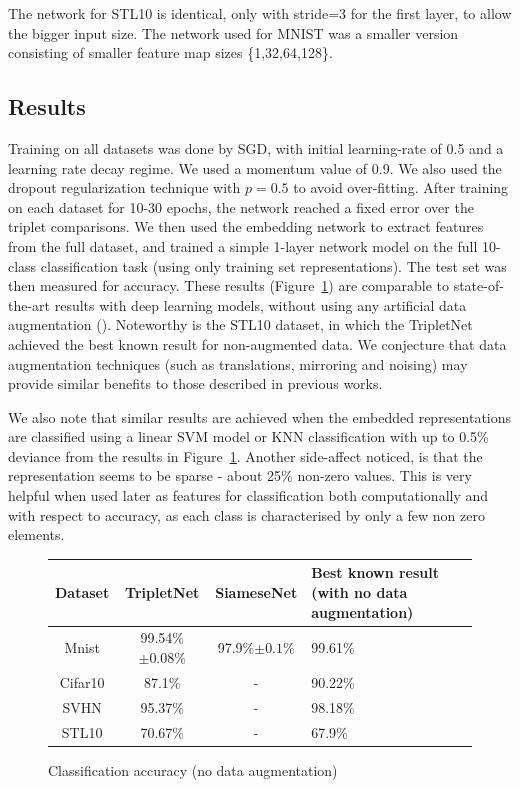 \documentclass{article} %
\begin{document}
 The network for STL10 is identical, only with stride=3 for the first layer, to allow the bigger input size. The network used for MNIST was a smaller version consisting of smaller feature map sizes \{1,32,64,128\}.



\subsection{Results}
Training on all datasets was done by SGD, with initial learning-rate of 0.5 and a learning rate decay regime. We used a momentum value of 0.9. We also used the dropout regularization technique with $p=0.5$ to avoid over-fitting.
After training on each dataset for 10-30 epochs, the network reached a fixed error over the triplet comparisons.
  We then used the embedding network to extract features from the full dataset, and trained a simple 1-layer network model on the full 10-class classification task (using only training set representations).  The test set was then measured for accuracy.  
  These results (Figure~\ref{results}) are comparable to state-of-the-art results with deep learning models, without using any artificial data augmentation (\citet{zeiler2013stochastic,goodfellow2013maxout,LinCY13}). 
  Noteworthy is the STL10 dataset, in which the TripletNet achieved the best known result for non-augmented data.
  We conjecture that data augmentation techniques (such as translations, mirroring and noising) may provide similar benefits to those described in previous works.

    We also note that similar results are achieved when the embedded representations are classified using a linear SVM model or KNN classification with up to 0.5\% deviance from the results in Figure~\ref{results}.
Another side-affect noticed, is that the representation seems to be sparse - about 25\% non-zero values. This is very helpful when used later as features for classification both computationally and with respect to accuracy, as each class is characterised by only a few non zero elements.  
  
  


\begin{figure}[h]

    \begin{tabular}{ | c | c | c | p{8cm} |}
    \hline
    Dataset & TripletNet   & SiameseNet  & Best known result (with no data augmentation)       \\ \hline
    Mnist & 99.54\%$\pm 0.08\%$ & 97.9\%$\pm 0.1\%$& 99.61\% \citet{mairal2014convolutional,lee2014deeply}  \\ \hline
    Cifar10 & 87.1\% & - & 90.22\% \citet{lee2014deeply}  \\ \hline
    SVHN &  95.37\% & -& 98.18\% \citet{lee2014deeply} \\ \hline
    STL10& 70.67\%& - & 67.9\% \citet{lin2014stable}\\ \hline
    \end{tabular}
     \caption{Classification accuracy (no data augmentation)}\label{results}
     \end{figure}
\end{document}
